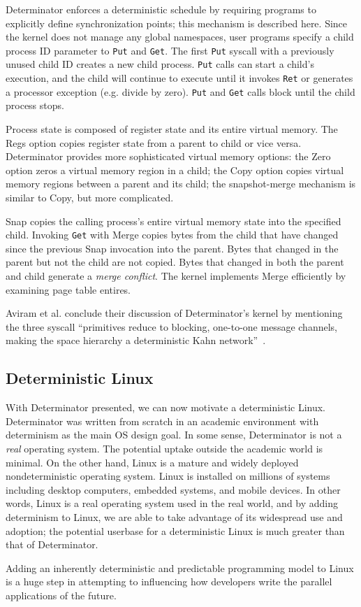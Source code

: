 Determinator enforces a deterministic schedule by requiring programs to
explicitly define synchronization points; this mechanism is described here.
Since the kernel does not manage any global namespaces, user programs specify
a child process ID parameter to {\tt Put} and {\tt Get}. The first {\tt Put}
syscall with a previously unused child ID creates a new child process.
{\tt Put} calls can start a child's execution, and the child will continue to
execute until it invokes {\tt Ret} or generates a processor exception (e.g.
divide by zero). {\tt Put} and {\tt Get} calls block until the child process
stops.

Process state is composed of register state and its entire virtual memory.
The Regs option copies register state from a parent to child or vice versa.
Determinator provides more sophisticated virtual memory options: the Zero
option zeros a virtual memory region in a child; the Copy option copies
virtual memory regions between a parent and its child; the snapshot-merge
mechanism is similar to Copy, but more complicated.

Snap copies the calling process's entire virtual memory state into the specified
child. Invoking {\tt Get} with Merge copies bytes
from the child that have changed since the previous Snap invocation into the
parent. Bytes that changed in the parent but not the child are not copied. Bytes
that changed in both the parent and child generate a \emph{merge conflict}.
The kernel implements Merge efficiently by examining page table entires.

Aviram et al. conclude their discussion of Determinator's kernel by mentioning
the three syscall ``primitives reduce to blocking, one-to-one message channels,
making the space hierarchy a deterministic Kahn
network''~\cite{kahn1974semantics}.

\subsection{Deterministic Linux}

With Determinator presented, we can now motivate a deterministic Linux.
Determinator was written from scratch in an academic environment with
determinism as the main OS design goal. In some sense, Determinator is not a
\emph{real} operating system. The potential uptake outside the academic
world is minimal. On the other hand, Linux is a mature and widely deployed
nondeterministic operating system. Linux is installed on millions of systems
including desktop computers, embedded systems, and mobile devices. In other
words, Linux is a real operating system used in the real world, and by adding
determinism to Linux, we are able to take advantage of its widespread
use and adoption; the potential userbase for a deterministic Linux is
much greater than that of Determinator.

Adding an inherently deterministic and predictable programming model to Linux is
a huge step in attempting to influencing how developers write the parallel
applications of the future.

\endinput

